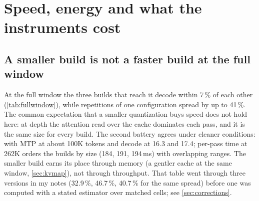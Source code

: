 \section{Speed, energy and what the instruments cost}\label{sec:efficiency}

\subsection{A smaller build is not a faster build at the full window}
\begin{table}[h]
\centering\small
\caption{Decode at the full 262{,}144 window (prefill to 94.8\,\%), first battery, MTP $n{=}2$,
 KV, official non-thinking sampling, 192-token generations. Groups match on build, context,
split and checkpoint setting. Spread is (max$-$min)/median; the adjusted column divides each reading by
its tokens-per-pass (\cref{sec:variance}).}\label{tab:fullwindow}
\end{table}

At the full window the three builds that reach it decode within 7\,\% of each other
(\cref{tab:fullwindow}), while repetitions of one configuration spread by up to 41\,\%. The common
expectation that a smaller quantization buys speed does not hold here: at depth the attention read over
the cache dominates each pass, and it is the same size for every build. The second battery agrees
under cleaner conditions: with MTP at about 100K tokens \Qsix{} and \Qfour{} decode at 16.3 and
17.4\tps; per-pass time at 262K orders the builds by size (184, 191, 194\,ms) with overlapping
ranges. The smaller build earns its place through memory (a gentler cache at the same window,
\cref{sec:kvmap}), not through throughput. That table went through three versions in my notes (32.9\,\%,
46.7\,\%, 40.7\,\% for the same spread) before one was computed with a stated estimator over matched
cells; see \cref{sec:corrections}.

